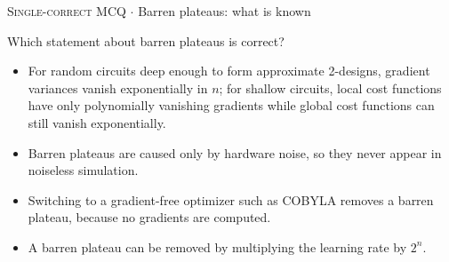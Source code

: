 \documentclass[11pt,a4paper]{article}
\newcommand{\optlabel}[1]{\textbf{(#1)}}
\newcommand{\correctlabel}[1]{\textcolor{okgreen}{\textbf{(#1)}\,\ding{51}}}
\newenvironment{qitem}[1]{\begin{list}{}{\setlength{\leftmargin}{3.3em}\setlength{\labelwidth}{3.1em}%
  \setlength{\labelsep}{0.2em}\setlength{\topsep}{3pt}\setlength{\parsep}{3pt}}\item[\textbf{Q.#1}\hfill]}{\end{list}}
\newcommand{\qmeta}[2]{{\footnotesize\color{black!60}\textsc{#1} \;$\cdot$\; #2}\par}
\begin{document}
\begin{qitem}{62}
\qmeta{Single-correct MCQ}{Barren plateaus: what is known}
Which statement about barren plateaus is correct?
\begin{itemize}[leftmargin=2.6em, labelsep=0.4em, itemsep=2pt, topsep=3pt]
\item[\correctlabel{A}] For random circuits deep enough to form approximate 2-designs, gradient variances vanish exponentially in $n$; for shallow circuits, local cost functions have only polynomially vanishing gradients while global cost functions can still vanish exponentially.
\item[\optlabel{B}] Barren plateaus are caused only by hardware noise, so they never appear in noiseless simulation.
\item[\optlabel{C}] Switching to a gradient-free optimizer such as COBYLA removes a barren plateau, because no gradients are computed.
\item[\optlabel{D}] A barren plateau can be removed by multiplying the learning rate by $2^n$.
\end{itemize}
\end{qitem}
\end{document}

